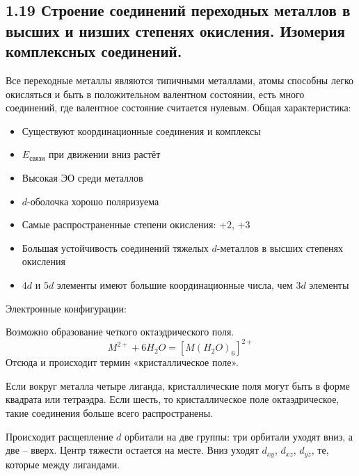 

\subsection{1.19 Строение соединений переходных металлов в высших и низших степенях окисления. Изомерия комплексных соединений.}
Все переходные металлы являются типичными металлами, атомы способны легко окисляться и быть в положительном валентном состоянии, есть много соединений, где валентное состояние считается нулевым.
Общая характеристика:
\begin{itemize}
	\item Существуют координационные соединения и комплексы
	\item $E_{\text{связи}}$ при движении вниз растёт
	\item Высокая ЭО среди металлов
	\item $d$-оболочка хорошо поляризуема 
	\item Самые распространенные степени окисления: $+2$, $+3$
	\item Большая устойчивость соединений тяжелых $d$-металлов в высших степенях окисления
	\item $4d$ и $5d$ элементы имеют большие координационные числа, чем $3d$ элементы
\end{itemize}
\begin{figure} [H]
	\centering {\texttt{[image: qq1]}}
\end{figure}
Электронные конфигурации:
\begin{figure} [H]
	\centering {\texttt{[image: qq2]}}
\end{figure}
Возможно образование четкого октаэдрического поля.  
\[
M^{2+} + 6H_2O = \left[M(H_2O)_6\right]^{2+}
\]
Отсюда и происходит термин «кристаллическое поле». 
\begin{figure} [H]
	\centering {\texttt{[image: qq3]}}
\end{figure}
Если вокруг металла четыре лиганда, кристаллические поля могут быть в форме квадрата или тетраэдра. Если шесть, то кристаллическое поле октаэдрическое, такие соединения больше всего распространены. 
\begin{figure} [H]
	\centering {\texttt{[image: qq4]}}
\end{figure}
Происходит расщепление $d$ орбитали на две группы: три орбитали уходят вниз, а две – вверх. Центр тяжести остается на месте. Вниз уходят $d_{xy}$, $d_{xz}$, $d_{yz}$, те, которые между лигандами. \\
